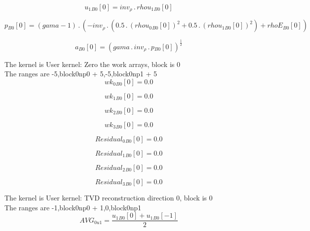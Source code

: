 \documentclass{article}
\begin{document}
\begin{dmath}{u_{1}{_{B0}}}[{0}] = inv_{\rho} \,.\, {rhou_{1}{_{B0}}}[{0}]\end{dmath}

\begin{dmath}{p{_{B0}}}[{0}] = \left(gama - 1\right) \,.\, \left(- inv_{\rho} \,.\, \left(0.5 \,.\, \left({rhou_{0}{_{B0}}}[{0}] \right)^{2} + 0.5 \,.\, \left({rhou_{1}{_{B0}}}[{0}] \right)^{2}\right) + {rhoE{_{B0}}}[{0}]\right)\end{dmath}

\begin{dmath}{a{_{B0}}}[{0}] = \left(gama \,.\, inv_{\rho} \,.\, {p{_{B0}}}[{0}] \right)^{\frac{1}{2}}\end{dmath}

\noindent The kernel is User kernel: Zero the work arrays, block is 0\\\noindent The ranges are -5,block0np0 + 5,-5,block0np1 + 5\\\begin{dmath}{wk_{0}{_{B0}}}[{0}] = 0.0\end{dmath}

\begin{dmath}{wk_{1}{_{B0}}}[{0}] = 0.0\end{dmath}

\begin{dmath}{wk_{2}{_{B0}}}[{0}] = 0.0\end{dmath}

\begin{dmath}{wk_{3}{_{B0}}}[{0}] = 0.0\end{dmath}

\begin{dmath}{Residual_{0}{_{B0}}}[{0}] = 0.0\end{dmath}

\begin{dmath}{Residual_{1}{_{B0}}}[{0}] = 0.0\end{dmath}

\begin{dmath}{Residual_{2}{_{B0}}}[{0}] = 0.0\end{dmath}

\begin{dmath}{Residual_{3}{_{B0}}}[{0}] = 0.0\end{dmath}

\noindent The kernel is User kernel: TVD reconstruction direction 0, block is 0\\\noindent The ranges are -1,block0np0 + 1,0,block0np1\\\begin{dmath}AVG_{0 u1} = \frac{{u_{1}{_{B0}}}[{0}] + {u_{1}{_{B0}}}[{-1}]}{2}\end{dmath}
\end{document}
